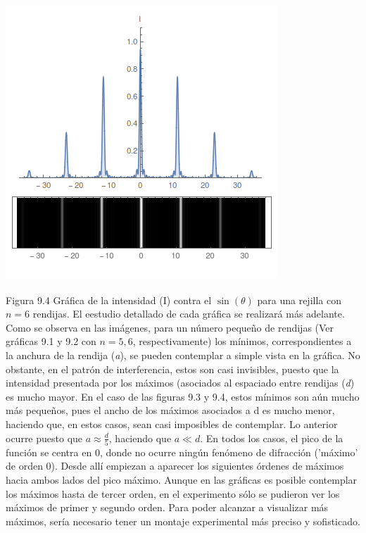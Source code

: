 \documentclass[%
 reprint,
 amsmath,amssymb,
 aps,
]{revtex4-1}
\begin{document}
\includegraphics[scale= 0.5]{15.png}

Figura 9.4 Gráfica de la intensidad (I) contra el $\sin{(\theta)}$ para una rejilla con $n=6$ rendijas. El eestudio detallado de cada gráfica se realizará más adelante. \\

Como se observa en las imágenes, para un número pequeño de rendijas (Ver gráficas 9.1 y 9.2 con $n=5,6$, respectivamente) los mínimos, correspondientes a la anchura de la rendija (\textit{a}), se pueden contemplar a simple vista en la gráfica. No obstante, en el patrón de interferencia, estos son casi invisibles, puesto que la intensidad presentada por los máximos (asociados al espaciado entre rendijas (\textit{d}) es mucho mayor. En el caso de las figuras 9.3 y 9.4, estos mínimos son aún mucho más pequeños, pues el ancho de los máximos asociados a d es mucho menor, haciendo que, en estos casos, sean casi imposibles de contemplar. Lo anterior ocurre puesto que $a \approx \frac{d}{5}$, haciendo que $a \ll d$. En todos los casos, el pico de la función se centra en 0, donde no ocurre ningún fenómeno de difracción ('máximo' de orden 0). Desde allí empiezan a aparecer los siguientes órdenes de máximos hacia ambos lados del pico máximo. Aunque en las gráficas es posible contemplar los máximos hasta de tercer orden, en el experimento sólo se pudieron ver los máximos de primer y segundo orden. Para poder alcanzar a visualizar más máximos, sería necesario tener un montaje experimental más preciso y sofisticado. \\
\end{document}
